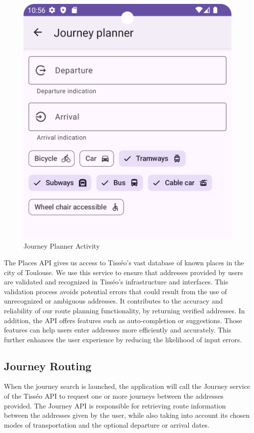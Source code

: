 \begin{figure}[h]
    \centering
    \includegraphics[scale=0.25]{img/journey.png}
    \caption{Journey Planner Activity}
    \label{fig:JourneyPlanner}
\end{figure}

The Places API gives us access to Tisséo's vast database of known places in the city of Toulouse. We use this service to ensure that addresses provided by users are validated and recognized in Tisséo's infrastructure and interfaces. This validation process avoids potential errors that could result from the use of unrecognized or ambiguous addresses. It contributes to the accuracy and reliability of our route planning functionality, by returning verified addresses.
In addition, the API offers features such as auto-completion or suggestions. Those features can help users enter addresses more efficiently and accurately. This further enhances the user experience by reducing the likelihood of input errors.\newline

\subsection{Journey Routing}
When the journey search is launched, the application will call the Journey service of the Tisséo API to request one or more journeys between the addresses provided. The Journey API is responsible for retrieving route information between the addresses given by the user, while also taking into account its chosen modes of transportation and the optional departure or arrival dates.\newline

